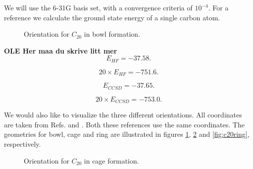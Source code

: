 We will use the 6-31G basis set, with a convergence criteria of
$10^{-4}$. For a reference we calculate the ground state energy of a
single carbon atom.
\begin{figure}[h!]
\begin{center}
\caption{Orientation for $C_{20}$ in bowl formation.}
\label{fig:c20bowl}
\end{center}
\end{figure}
{\bf OLE Her maa du skrive litt mer}
\begin{equation}
E_{HF} = -37.58 .
\end{equation}

\begin{equation}
20 \times E_{HF} = -751.6 .
\end{equation}

\begin{equation}
E_{CCSD} = -37.65 .
\end{equation}

\begin{equation}
20 \times E_{CCSD} = -753.0 .
\end{equation}

We would also like to visualize the three different orientations. All
coordinates are taken from Refs.\cite{c20coordinatesarticlezz} and
\cite{c20coordinatesarticlezz10}. Both these references use the same
coordinates. The geometries for bowl, cage and ring are illustrated in
figures \ref{fig:c20bowl}, \ref{fig:c20cage} and \ref{fig:c20ring}, respectively.\\
\begin{figure}[h!]
\begin{center}
\caption{Orientation for $C_{20}$ in cage formation.}
\label{fig:c20cage}
\end{center}
\end{figure}

